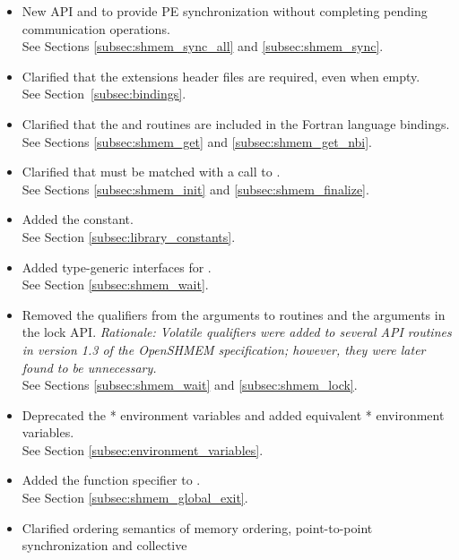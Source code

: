 \begin{itemize}

\item New API  and  to provide PE
    synchronization without completing pending communication operations.
    \\See Sections \ref{subsec:shmem_sync_all} and \ref{subsec:shmem_sync}.
%
\item Clarified that the \openshmem extensions header files are required, even when empty.
\\See Section~\ref{subsec:bindings}.
%
\item Clarified that the  and 
    routines are included in the Fortran language bindings.\\
    See Sections \ref{subsec:shmem_get} and \ref{subsec:shmem_get_nbi}.
%
\item Clarified that  must be matched with a call to
    .
\\See Sections \ref{subsec:shmem_init} and \ref{subsec:shmem_finalize}.
%
\item Added the  constant.
\\See Section \ref{subsec:library_constants}.
%
\item Added type-generic interfaces for .
\\ See Section \ref{subsec:shmem_wait}.
%
\item Removed the  qualifiers from the  arguments to
 routines and the  arguments in the lock API.
\emph{Rationale: Volatile qualifiers were added to several API routines in
version 1.3 of the OpenSHMEM specification; however, they were later found
to be unnecessary.}
\\ See Sections \ref{subsec:shmem_wait} and \ref{subsec:shmem_lock}.
%
\item Deprecated the * environment variables and added equivalent
* environment variables.
\\ See Section \ref{subsec:environment_variables}.
%
\item Added the \Cstd[11]  function specifier to
.
\\ See Section \ref{subsec:shmem_global_exit}.
%
\item Clarified ordering semantics of memory ordering, point-to-point synchronization and collective 

\end{itemize}
